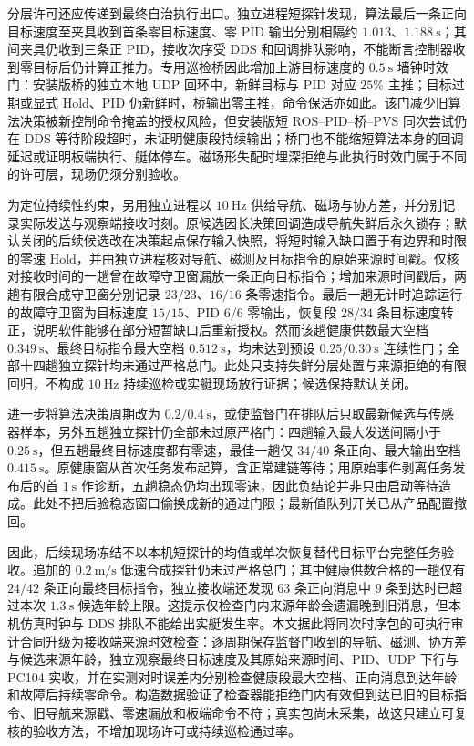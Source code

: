 分层许可还应传递到最终自治执行出口。独立进程短探针发现，算法最后一条正向目标速度至夹具收到首条零目标速度、零 PID 输出分别相隔约 $1.013$、$1.188~\mathrm{s}$；其间夹具仍收到三条正 PID，接收次序受 DDS 和回调排队影响，不能断言控制器收到零目标后仍计算正推力。专用巡检桥因此增加上游目标速度的 $0.5~\mathrm{s}$ 墙钟时效门：安装版桥的独立本地 UDP 回环中，新鲜目标与 PID 对应 $25\%$ 主推；目标过期或显式 Hold、PID 仍新鲜时，桥输出零主推，命令保活亦如此。该门减少旧算法决策被新控制命令掩盖的授权风险，但安装版短 ROS--PID--桥--PVS 同次尝试仍在 DDS 等待阶段超时，未证明健康段持续输出；桥门也不能缩短算法本身的回调延迟或证明板端执行、艇体停车。磁场形失配时埋深拒绝与此执行时效门属于不同的许可层，现场仍须分别验收。

为定位持续性约束，另用独立进程以 $10~\mathrm{Hz}$ 供给导航、磁场与协方差，并分别记录实际发送与观察端接收时刻。原候选因长决策回调造成导航失鲜后永久锁存；默认关闭的后续候选改在决策起点保存输入快照，将短时输入缺口置于有边界和时限的零速 Hold，并由独立进程核对导航、磁测及目标指令的原始来源时间戳。仅核对接收时间的一趟曾在故障守卫窗漏放一条正向目标指令；增加来源时间戳后，两趟有限合成守卫窗分别记录 $23/23$、$16/16$ 条零速指令。最后一趟无计时追踪运行的故障守卫窗为目标速度 $15/15$、PID $6/6$ 零输出，恢复段 $28/34$ 条目标速度转正，说明软件能够在部分短暂缺口后重新授权。然而该趟健康供数最大空档 $0.349~\mathrm{s}$、最终目标指令最大空档 $0.512~\mathrm{s}$，均未达到预设 $0.25/0.30~\mathrm{s}$ 连续性门；全部十四趟独立探针均未通过严格总门。此处只支持失鲜分层处置与来源拒绝的有限回归，不构成 $10~\mathrm{Hz}$ 持续巡检或实艇现场放行证据；候选保持默认关闭。

进一步将算法决策周期改为 $0.2/0.4~\mathrm{s}$，或使监督门在排队后只取最新候选与传感器样本，另外五趟独立探针仍全部未过原严格门：四趟输入最大发送间隔小于 $0.25~\mathrm{s}$，但五趟最终目标速度都有零速，最佳一趟仅 $34/40$ 条正向、最大输出空档 $0.415~\mathrm{s}$。原健康窗从首次任务发布起算，含正常建链等待；用原始事件剥离任务发布后的首 $1~\mathrm{s}$ 作诊断，五趟稳态仍均出现零速，因此负结论并非只由启动等待造成。此处不把后验稳态窗口偷换成新的通过门限；最新值队列开关已从产品配置撤回。

因此，后续现场冻结不以本机短探针的均值或单次恢复替代目标平台完整任务验收。追加的 $0.2~\mathrm{m/s}$ 低速合成探针仍未过严格总门；其中健康供数合格的一趟仅有 $24/42$ 条正向最终目标指令，独立接收端还发现 $63$ 条正向消息中 $9$ 条到达时已超过本次 $1.3~\mathrm{s}$ 候选年龄上限。这提示仅检查门内来源年龄会遗漏晚到旧消息，但本机仿真时钟与 DDS 排队不能给出实艇发生率。本文据此将同次时序包的可执行审计合同升级为接收端来源时效检查：逐周期保存监督门收到的导航、磁测、协方差与候选来源年龄，独立观察最终目标速度及其原始来源时间、PID、UDP 下行与 PC104 实收，并在实测对时误差内分别检查健康段最大空档、正向消息到达年龄和故障后持续零命令。构造数据验证了检查器能拒绝门内有效但到达已旧的目标指令、旧导航来源戳、零速漏放和板端命令不符；真实包尚未采集，故这只建立可复核的验收方法，不增加现场许可或持续巡检通过率。

